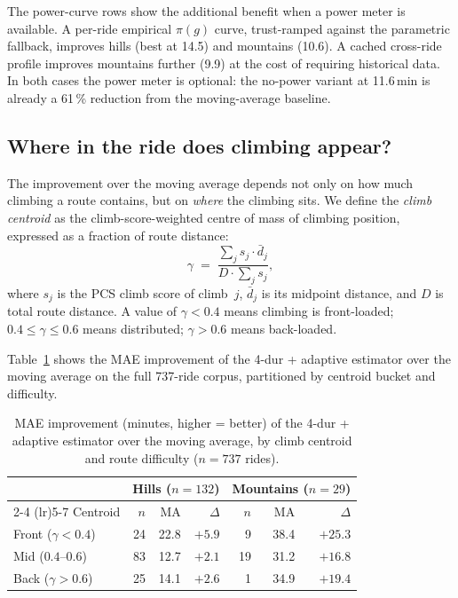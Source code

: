 \documentclass[11pt,a4paper]{article}
\begin{document}
The power-curve rows show the additional benefit when a power meter is
available. A per-ride empirical $\pi(g)$ curve, trust-ramped against
the parametric fallback, improves hills (best at 14.5) and mountains
(10.6). A cached cross-ride profile improves mountains further (9.9)
at the cost of requiring historical data. In both cases the power
meter is optional: the no-power variant at 11.6\,\si{\minute} is
already a 61\,\% reduction from the moving-average baseline.


\subsection{Where in the ride does climbing appear?}
\label{sec:centroid}

The improvement over the moving average depends not only on how much
climbing a route contains, but on \emph{where} the climbing sits. We
define the \emph{climb centroid} as the climb-score-weighted centre of
mass of climbing position, expressed as a fraction of route distance:
\begin{equation}
\label{eq:centroid}
\gamma \;=\;
\frac{\sum_j s_j \cdot \bar{d}_j}{D \cdot \sum_j s_j},
\end{equation}
where $s_j$ is the PCS climb score of climb~$j$, $\bar{d}_j$ is its
midpoint distance, and $D$ is total route distance. A value of
$\gamma < 0.4$ means climbing is front-loaded; $0.4 \le \gamma \le
0.6$ means distributed; $\gamma > 0.6$ means back-loaded.

Table~\ref{tab:centroid} shows the MAE improvement of the
4-dur + adaptive estimator over the moving average on the full
737-ride corpus, partitioned by centroid bucket and difficulty.

\begin{table}[ht]
\centering
\caption{MAE improvement (minutes, higher = better) of the
4-dur + adaptive estimator over the moving average, by climb
centroid and route difficulty ($n = 737$ rides).}
\label{tab:centroid}
\begin{tabular}{@{} l rrr rrr @{}}
\toprule
& \multicolumn{3}{c}{Hills ($n = 132$)}
& \multicolumn{3}{c}{Mountains ($n = 29$)} \\
\cmidrule(lr){2-4} \cmidrule(lr){5-7}
Centroid
  & {$n$} & {MA} & {$\Delta$}
  & {$n$} & {MA} & {$\Delta$} \\
\midrule
Front ($\gamma < 0.4$)
  & 24 & 22.8 & {$+5.9$}
  & 9  & 38.4 & {$+25.3$} \\
Mid ($0.4$--$0.6$)
  & 83 & 12.7 & {$+2.1$}
  & 19 & 31.2 & {$+16.8$} \\
Back ($\gamma > 0.6$)
  & 25 & 14.1 & {$+2.6$}
  & 1  & 34.9 & {$+19.4$} \\
\bottomrule
\end{tabular}
\end{table}
\end{document}
